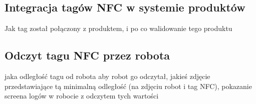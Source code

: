 \subsection{Integracja tagów NFC w systemie produktów}

Jak tag został połączony z produktem, i po co walidowanie tego produktu


\subsection{Odczyt tagu NFC przez robota}

jaka odległość tagu od robota aby robot go odczytał, jakieś zdjęcie przedstawiające tą minimalną odległość (na zdjęciu robot i tag NFC), pokazanie screena logów w robocie z odczytem tych wartości
